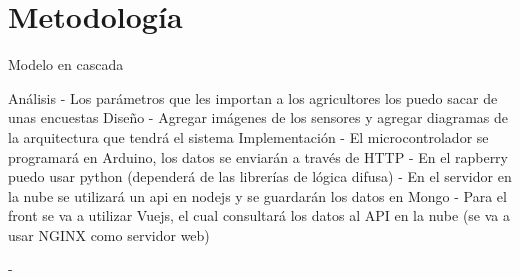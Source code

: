\section{Metodología}

Modelo en cascada

Análisis 
    - Los parámetros que les importan a los agricultores los puedo sacar de unas encuestas
Diseño
    - Agregar imágenes de los sensores y agregar diagramas de la arquitectura que tendrá el sistema
Implementación
    - El microcontrolador se programará en Arduino, los datos se enviarán a través de HTTP
    - En el rapberry puedo usar python (dependerá de las librerías de lógica difusa)
    - En el servidor en la nube se utilizará un api en nodejs y se guardarán los datos en Mongo
    - Para el front se va a utilizar Vuejs, el cual consultará los datos al API en la nube (se va a usar NGINX como servidor web)

    - 



